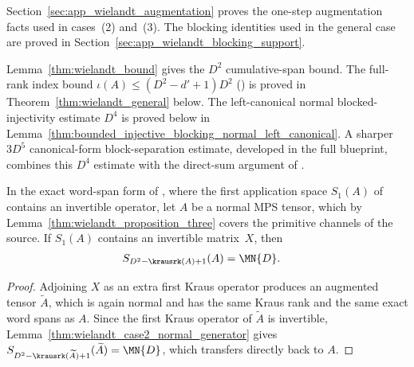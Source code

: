 Section~\ref{sec:app_wielandt_augmentation} proves the one-step augmentation
facts used in cases~(2) and~(3). The blocking identities used in the general
case are proved in Section~\ref{sec:app_wielandt_blocking_support}.

\begin{remark}\leanok
    Lemma~\ref{thm:wielandt_bound} gives the $D^2$ cumulative-span bound.
    The full-rank index bound
    $\iota(A)\le(D^2-d'+1)D^2$
    (\cite[Theorem~1, case~(1)]{Sanz2010Quantum}) is proved in
    Theorem~\ref{thm:wielandt_general} below.
    The left-canonical normal blocked-injectivity estimate $D^4$ is proved
    below in
    Lemma~\ref{thm:bounded_injective_blocking_normal_left_canonical}.
    A sharper $3D^5$ canonical-form block-separation estimate, developed in
    the full blueprint, combines this $D^4$ estimate with the direct-sum
    argument of \cite{PerezGarcia2007Matrix}.
\end{remark}

\begin{lemma}%
    \label{thm:wielandt_case2_one_step_span}
    \leanok
    In the exact word-span form of \cite[Theorem~1, case~(2)]{Sanz2010Quantum},
    where the first application space $S_1(A)$ of~\cite{Sanz2010Quantum}
    contains an invertible operator, let $A$ be a normal MPS tensor, which
    by Lemma~\ref{thm:wielandt_proposition_three} covers the primitive
    channels of the source.
    If $S_1(A)$ contains an invertible matrix~$X$, then
    \begin{align}
        S_{D^2-\krausrk(A)+1}(A)
         & =\MN{D}.
        \label{eq:wld_case2_one_step_wordspan_top}
    \end{align}
\end{lemma}

\begin{proof}
    \leanok
    Adjoining $X$ as an extra first Kraus operator produces an augmented tensor
    $\widetilde A$, which is again normal and has the same Kraus rank
    and the same exact word spans as $A$. Since the first Kraus operator of $\widetilde A$
    is invertible, Lemma~\ref{thm:wielandt_case2_normal_generator} gives
    $S_{D^2-\krausrk(\widetilde A)+1}(\widetilde A)=\MN{D}$, which transfers
    directly back to $A$.
\end{proof}

